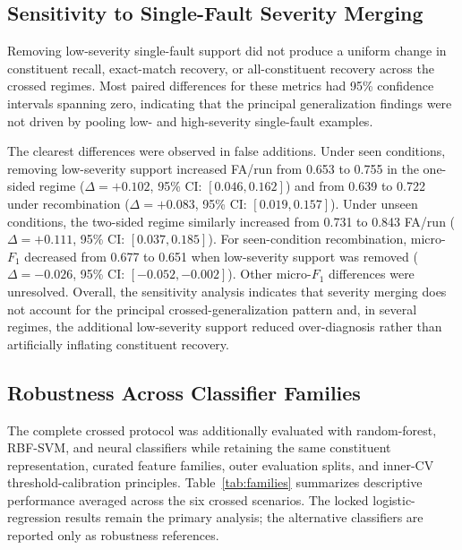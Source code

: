\subsection{Sensitivity to Single-Fault Severity Merging}
\label{sec:severityresults}

Removing low-severity single-fault support did not produce a uniform change
in constituent recall, exact-match recovery, or all-constituent recovery
across the crossed regimes. Most paired differences for these metrics had
95\% confidence intervals spanning zero, indicating that the principal
generalization findings were not driven by pooling low- and high-severity
single-fault examples.

The clearest differences were observed in false additions. Under seen
conditions, removing low-severity support increased FA/run from 0.653 to
0.755 in the one-sided regime ($\Delta = +0.102$, 95\% CI:
$[0.046, 0.162]$) and from 0.639 to 0.722 under recombination
($\Delta = +0.083$, 95\% CI: $[0.019, 0.157]$). Under unseen conditions,
the two-sided regime similarly increased from 0.731 to 0.843 FA/run
($\Delta = +0.111$, 95\% CI: $[0.037, 0.185]$). For seen-condition
recombination, micro-$F_1$ decreased from 0.677 to 0.651 when low-severity
support was removed ($\Delta = -0.026$, 95\% CI: $[-0.052, -0.002]$).
Other micro-$F_1$ differences were unresolved. Overall, the sensitivity
analysis indicates that severity merging does not account for the principal
crossed-generalization pattern and, in several regimes, the additional
low-severity support reduced over-diagnosis rather than artificially
inflating constituent recovery.

\subsection{Robustness Across Classifier Families}
\label{sec:familyresults}

The complete crossed protocol was additionally evaluated with
random-forest, RBF-SVM, and neural classifiers while retaining the same
constituent representation, curated feature families, outer evaluation
splits, and inner-CV threshold-calibration principles.
Table~\ref{tab:families} summarizes descriptive performance averaged across
the six crossed scenarios. The locked logistic-regression results remain
the primary analysis; the alternative classifiers are reported only as
robustness references.

